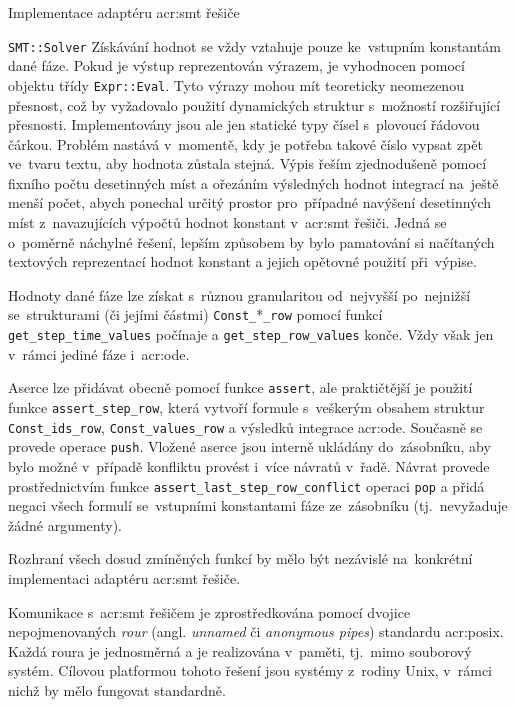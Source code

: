\documentclass[thesis=M,czech]{FITthesis}[2012/06/26]
\newcommand{\acrlabel}[1]{acr:#1}
\newcommand{\acr}[1]{\acrshort{\acrlabel{#1}}}
\newcommand{\id}[1]{\texttt{#1}}
\newcommand{\hl}[1]{\textit{#1}}
\newcommand{\name}[1]{\hl{#1}}
\begin{document}
\begin{section}{Implementace adaptéru \acr{smt} řešiče}
\begin{paragraph}{\id{SMT::\-Solver}}
Získávání hodnot se vždy vztahuje pouze ke~vstupním konstantám
dané fáze. Pokud je výstup reprezentován výrazem,
je vyhodnocen pomocí objektu třídy \id{Expr::\-Eval}.
Tyto výrazy mohou mít teoreticky neomezenou přesnost,
což by vyžadovalo použití dynamických struktur
s~možností rozšiřující přesnosti.
Implementovány jsou ale jen statické typy
čísel s~plovoucí řádovou čárkou.
Problém nastává v~momentě,
kdy je potřeba takové číslo vypsat zpět ve~tvaru textu,
aby hodnota zůstala stejná.
Výpis řeším zjednodušeně pomocí fixního počtu desetinných míst
a ořezáním výsledných hodnot integrací na~ještě menší počet,
abych ponechal určitý prostor pro~případné navýšení desetinných míst
z~navazujících výpočtů hodnot konstant v~\acr{smt} řešiči.
Jedná se o~poměrně náchylné řešení,
lepším způsobem by bylo pamatování si načítaných textových reprezentací
hodnot konstant a jejich opětovné použití při~výpise.

Hodnoty dané fáze lze získat s~různou granularitou
od~nejvyšší po~nejnižší se~strukturami (či jejími částmi)
\id{Const\_\-}*\id{\_\-row}
pomocí funkcí \id{get\_\-step\_\-time\_\-values} počínaje
a \id{get\_\-step\_\-row\_\-values} konče.
Vždy však jen v~rámci jediné fáze i~\acr{ode}.

Aserce lze přidávat obecně pomocí funkce \id{assert},
ale praktičtější je použití funkce \id{assert\_\-step\_\-row},
která vytvoří formule s~veškerým obsahem struktur
\id{Const\_\-ids\_\-row}, \id{Const\_\-values\_\-row}
a výsledků integrace \acr{ode}.
Současně se provede operace \id{push}.
Vložené aserce jsou interně ukládány do~zásobníku,
aby bylo možné v~případě konfliktu
provést i~více návratů v~řadě.
Návrat provede prostřednictvím funkce
\id{assert\_\-last\_\-step\_\-row\_\-conflict}
operaci \id{pop} a přidá negaci
všech formulí se~vstupními konstantami fáze
ze~zásobníku (tj.~nevyžaduje žádné argumenty).

Rozhraní všech dosud zmíněných funkcí by mělo být nezávislé
na~konkrétní implementaci adaptéru \acr{smt} řešiče.
\end{paragraph} %


\begin{paragraph}{Komunikace s~\acr{smt} řešičem}\label{s:impl:smt:pipe}
je zprostředkována pomocí dvojice nepojmenovaných
\name{rour} (angl. \name{unnamed} či \name{anonymous pipes})
standardu \acr{posix}. Každá roura je jednosměrná
a je realizována v~paměti, tj.~mimo souborový systém.
Cílovou platformou tohoto řešení jsou systémy z~rodiny Unix,
v~rámci nichž by mělo fungovat standardně.


\end{paragraph}
\end{section}
\end{document}
